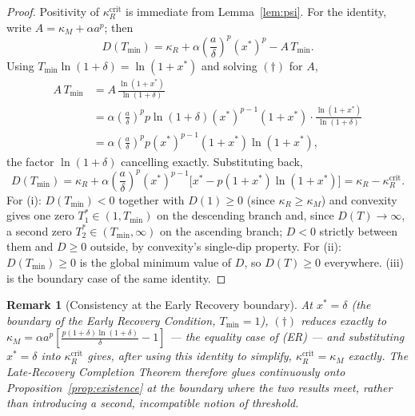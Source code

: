 \documentclass[11pt]{article}
\newtheorem*{remark}{Remark}
\begin{document}
\begin{proof}
Positivity of $\kappa_R^{\mathrm{crit}}$ is immediate from Lemma~\ref{lem:psi}. For the identity, write $A=\kappa_M+\alpha a^p$; then
\[
D(T_{\min}) = \kappa_R + \alpha\left(\frac{a}{\delta}\right)^p (x^*)^p - A\,T_{\min}.
\]
Using $T_{\min}\ln(1+\delta) = \ln(1+x^*)$ and solving $(\dagger)$ for $A$,
\begin{align*}
A\,T_{\min} &= A\,\frac{\ln(1+x^*)}{\ln(1+\delta)} \\
&= \alpha\left(\frac{a}{\delta}\right)^p p\ln(1+\delta)(x^*)^{p-1}(1+x^*)\cdot\frac{\ln(1+x^*)}{\ln(1+\delta)} \\
&= \alpha\left(\frac{a}{\delta}\right)^p p(x^*)^{p-1}(1+x^*)\ln(1+x^*),
\end{align*}
the factor $\ln(1+\delta)$ cancelling exactly. Substituting back,
\[
D(T_{\min}) = \kappa_R + \alpha\left(\frac{a}{\delta}\right)^p(x^*)^{p-1}\Big[x^* - p(1+x^*)\ln(1+x^*)\Big] = \kappa_R - \kappa_R^{\mathrm{crit}}.
\]
For (i): $D(T_{\min})<0$ together with $D(1)\geq 0$ (since $\kappa_R\geq\kappa_M$) and convexity gives one zero $T_1^*\in(1,T_{\min})$ on the descending branch and, since $D(T)\to\infty$, a second zero $T_2^*\in(T_{\min},\infty)$ on the ascending branch; $D<0$ strictly between them and $D\geq0$ outside, by convexity's single-dip property. For (ii): $D(T_{\min})\geq0$ is the global minimum value of $D$, so $D(T)\geq0$ everywhere. (iii) is the boundary case of the same identity.
\end{proof}

\begin{remark}[Consistency at the Early Recovery boundary]
At $x^*=\delta$ (the boundary of the Early Recovery Condition, $T_{\min}=1$), $(\dagger)$ reduces exactly to $\kappa_M = \alpha a^p\left[\frac{p(1+\delta)\ln(1+\delta)}{\delta}-1\right]$ — the equality case of (ER) — and substituting $x^*=\delta$ into $\kappa_R^{\mathrm{crit}}$ gives, after using this identity to simplify, $\kappa_R^{\mathrm{crit}} = \kappa_M$ exactly. The Late-Recovery Completion Theorem therefore glues continuously onto Proposition~\ref{prop:existence} at the boundary where the two results meet, rather than introducing a second, incompatible notion of threshold.
\end{remark}
\end{document}
